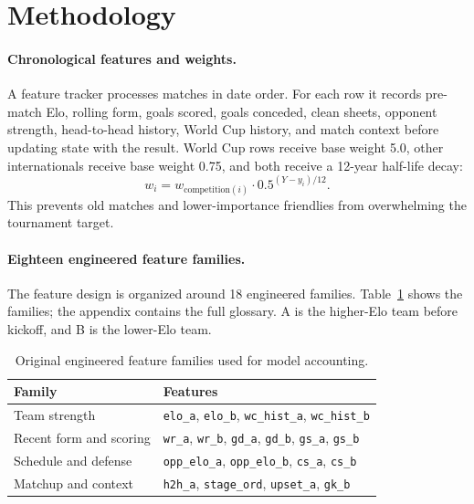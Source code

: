 \documentclass{article}
\begin{document}
\section{Methodology}

\paragraph{Chronological features and weights.}
A feature tracker processes matches in date order. For each row it records
pre-match Elo, rolling form, goals scored, goals conceded, clean sheets,
opponent strength, head-to-head history, World Cup history, and match context
before updating state with the result. World Cup rows receive base weight 5.0,
other internationals receive base weight 0.75, and both receive a 12-year
half-life decay:
\[
  w_i = w_{\mathrm{competition}(i)}\cdot 0.5^{(Y-y_i)/12}.
\]
This prevents old matches and lower-importance friendlies from overwhelming
the tournament target.

\paragraph{Eighteen engineered feature families.}
The feature design is organized around 18 engineered families.
Table~\ref{tab:features18} shows the families; the appendix contains the full
glossary. A is the higher-Elo team before kickoff, and B is the lower-Elo team.

\begin{table}[ht]
\centering
\small
\caption{Original engineered feature families used for model accounting.}
\label{tab:features18}
\begin{tabularx}{\textwidth}{lX}
\toprule
Family & Features \\
\midrule
Team strength & \texttt{elo\_a}, \texttt{elo\_b}, \texttt{wc\_hist\_a}, \texttt{wc\_hist\_b} \\
Recent form and scoring & \texttt{wr\_a}, \texttt{wr\_b}, \texttt{gd\_a}, \texttt{gd\_b}, \texttt{gs\_a}, \texttt{gs\_b} \\
Schedule and defense & \texttt{opp\_elo\_a}, \texttt{opp\_elo\_b}, \texttt{cs\_a}, \texttt{cs\_b} \\
Matchup and context & \texttt{h2h\_a}, \texttt{stage\_ord}, \texttt{upset\_a}, \texttt{gk\_b} \\
\bottomrule
\end{tabularx}
\end{table}
\end{document}
